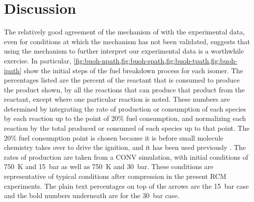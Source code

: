 \documentclass[../main.tex]{subfiles}
\begin{document}
\section{Discussion}
\label{sec:buoh-discussion}

The relatively good agreement of the mechanism of \textcite{Sarathy2012} with
the experimental data, even for conditions at which the mechanism has not been
validated, suggests that using the mechanism to further interpret our
experimental data is a worthwhile exercise. In particular,
\cref{fig:buoh-npath,fig:buoh-spath,fig:buoh-tpath,fig:buoh-ipath}
show the initial steps of the fuel breakdown process for each isomer.
The percentages listed are the percent of the reactant that is consumed
to produce the product shown, by all the reactions that can produce
that product from the reactant, except where one particular reaction
is noted. These numbers are determined by integrating the
rate of production or consumption of each species by each reaction up to the
point of 20\% fuel consumption, and normalizing each reaction by the total
produced or consumed of each species up to that point. The 20\% fuel
consumption point is chosen because it is before small molecule chemistry takes
over to drive the ignition, and it has been used previously
\cite{Weber2011,Sarathy2012}. The rates of production are taken from a CONV
simulation, with initial conditions of \SI{750}{\kelvin} and \SI{15}{\bar} as well as \SI{750}{\kelvin} and
\SI{30}{\bar}. These conditions are representative of typical conditions after compression
in the present RCM experiments. The plain text percentages on top of the arrows
are the \SI{15}{\bar} case and the bold numbers underneath are for the \SI{30}{\bar} case.
\end{document}
